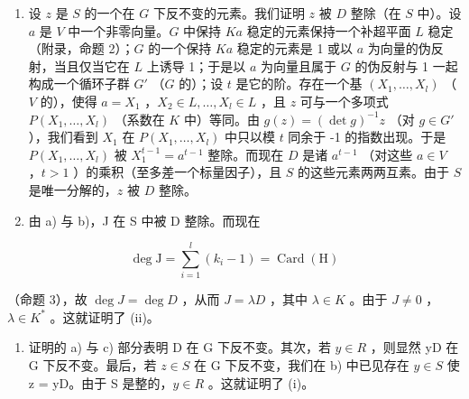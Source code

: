 \begin{enumerate}
\def\labelenumi{\alph{enumi})}
\setcounter{enumi}{1}
\item
  设 \(z\) 是 \(S\) 的一个在 \(G\) 下反不变的元素。我们证明 \(z\) 被 \(D\) 整除（在 \(S\) 中）。设 \(a\) 是 \(V\) 中一个非零向量。\(G\) 中保持 \(Ka\) 稳定的元素保持一个补超平面 \(L\) 稳定（附录，命题 2）；\(G\) 的一个保持 \(Ka\) 稳定的元素是 1 或以 \(a\) 为向量的伪反射，当且仅当它在 \(L\) 上诱导 1；于是以 \(a\) 为向量且属于 \(G\) 的伪反射与 1 一起构成一个循环子群 \(G'\) （\(G\) 的）；设 \(t\) 是它的阶。存在一个基 \((X_1, \ldots, X_l)\) （\(V\) 的），使得 \(a = X_1\) ，\(X_2 \in L, \ldots, X_l \in L\) ，且 \(z\) 可与一个多项式 \(P(X_1, \ldots, X_l)\) （系数在 \(K\) 中）等同。由 \(g(z) = (\det g)^{-1}z\) （对 \(g \in G'\) ），我们看到 \(X_1\) 在 \(P(X_1, \ldots, X_l)\) 中只以模 \(t\) 同余于 -1 的指数出现。于是 \(P(X_1, \ldots, X_l)\) 被 \(X_1^{t-1} = a^{t-1}\) 整除。而现在 \(D\) 是诸 \(a^{t-1}\) （对这些 \(a \in V\) ，\(t > 1\) ）的乘积（至多差一个标量因子），且 \(S\) 的这些元素两两互素。由于 \(S\) 是唯一分解的，\(z\) 被 \(D\) 整除。
\item
  由 a) 与 b)，J 在 S 中被 D 整除。而现在
\end{enumerate}

\[
\deg \mathrm{J} = \sum_ {i = 1} ^ {l} (k _ {i} - 1) = \operatorname{Card} (\mathrm{H})
\]

（命题 3），故 \(\deg J = \deg D\) ，从而 \(J = \lambda D\) ，其中 \(\lambda \in K\) 。由于 \(J \neq 0\) ，\(\lambda \in K^*\) 。这就证明了 (ii)。

\begin{enumerate}
\def\labelenumi{\alph{enumi})}
\setcounter{enumi}{3}
\tightlist
\item
  证明的 a) 与 c) 部分表明 D 在 G 下反不变。其次，若 \(y \in R\) ，则显然 yD 在 G 下反不变。最后，若 \(z \in S\) 在 G 下反不变，我们在 b) 中已见存在 \(y \in S\) 使 z = yD。由于 S 是整的，\(y \in R\) 。这就证明了 (i)。
\end{enumerate}
